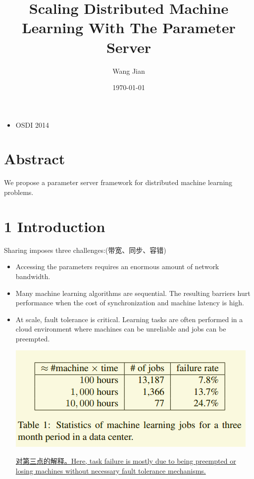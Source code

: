 \documentclass[11pt]{article}
\author{Wang Jian}
\date{\today}
\title{Scaling Distributed Machine Learning With The Parameter Server}
\begin{document}
\maketitle
\tableofcontents

\begin{itemize}
\item OSDI 2014
\end{itemize}
\section{Abstract}
\label{sec:orga1d5c76}
We propose a parameter server framework for distributed machine learning problems. 
\section{1 Introduction}
\label{sec:orgd8995d9}
Sharing imposes three challenges:(带宽、同步、容错)
\begin{itemize}
\item Accessing the parameters requires an enormous amount of network bandwidth.
\item Many machine learning algorithms are sequential. The resulting barriers hurt performance when the cost of synchronization and machine latency is high.
\item At scale, fault tolerance is critical. Learning tasks are often performed in a cloud environment where machines can be unreliable and jobs can be preempted.

\begin{center}
\includegraphics[width=.9\linewidth]{PS.org_imgs/20201108_162123_doWREW.png}
\end{center} 

\uline{对第三点的解释。Here, task failure is mostly due to being preempted or losing machines without necessary fault tolerance mechanisms.}
\end{itemize}
\end{document}
